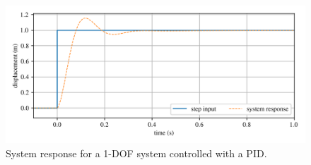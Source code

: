 \documentclass[12pt,letter]{article}
\begin{document}
\begin{figure}[H]
	\centering
	\includegraphics[]{../figures/PID_temporal_response_1.png}
	\caption{System response for a 1-DOF system controlled with a PID.}
	\label{fig:PID_temporal_response_1}
\end{figure}





%
%








	\pagebreak
	\renewcommand{\thepage}{}
	\renewcommand\refname{References Cited}
	\pagestyle{plain}
	
	






















			


	
\end{document}
